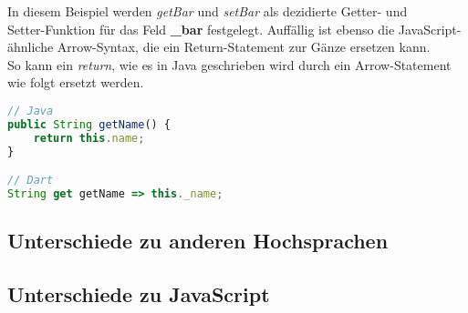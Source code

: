 In diesem Beispiel werden \textit{getBar} und \textit{setBar} als dezidierte Getter- und\\
Setter-Funktion für das Feld \textbf{\_bar} festgelegt.
Auffällig ist ebenso die JavaScript-ähnliche Arrow-Syntax, die ein Return-Statement
zur Gänze ersetzen kann.\\
So kann ein \textit{return}, wie es in Java geschrieben wird durch ein Arrow-Statement wie folgt
ersetzt werden.

\begin{lstlisting}[language=JavaScript]
// Java
public String getName() {
    return this.name;
}

// Dart
String get getName => this._name;
\end{lstlisting}






    











\subsection{Unterschiede zu anderen Hochsprachen}

\subsection{Unterschiede zu JavaScript}
